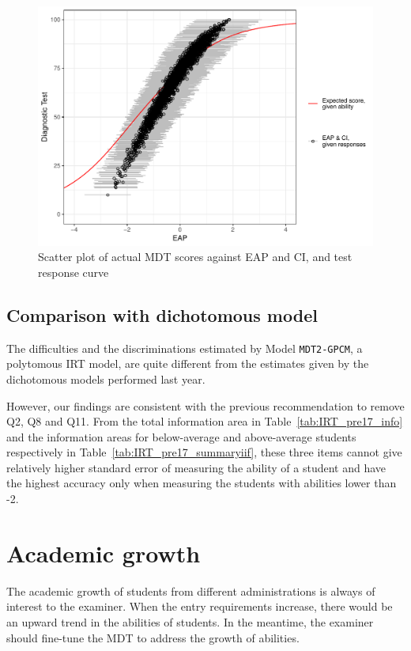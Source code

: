 \documentclass[a4paper]{report}
\begin{document}
\begin{figure}[H]
  \centering
  \includegraphics[width=\linewidth]{fig/IRT_pre17_EAP.pdf}
  \caption{\label{fig:IRT_pre17_EAP}Scatter plot of actual MDT scores against EAP and CI, and test response curve}
\end{figure}

\subsection{Comparison with dichotomous model}

The difficulties and the discriminations estimated by Model \texttt{MDT2-GPCM}, a polytomous IRT model, are quite different from the estimates given by the dichotomous models performed last year. 

However, our findings are consistent with the previous recommendation to remove Q2, Q8 and Q11. From the total information area in Table~\ref{tab:IRT_pre17_info} and the information areas for below-average and above-average students respectively in Table~\ref{tab:IRT_pre17_summaryiif}, these three items cannot give relatively higher standard error of measuring the ability of a student and have the highest accuracy only when measuring the students with abilities lower than -2. 

\section{Academic growth}

The academic growth of students from different administrations is always of interest to the examiner. When the entry requirements increase, there would be an upward trend in the abilities of students. In the meantime, the examiner should fine-tune the MDT to address the growth of abilities. 
\end{document}
